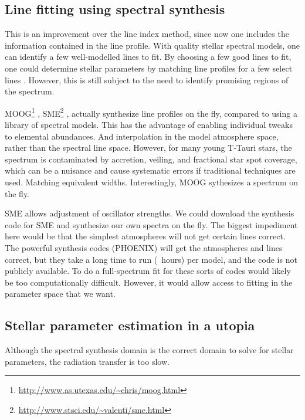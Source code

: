 \documentclass[preprint]{aastex} %
\begin{document}
\subsection{Line fitting using spectral synthesis}
This is an improvement over the line index method, since now one includes the information contained in the line profile. With quality stellar spectral models, one can identify a few well-modelled lines to fit. By choosing a few good lines to fit, one could determine stellar parameters by matching line profiles for a few select lines \citep{dj03}. However, this is still subject to the need to identify promising regions of the spectrum.

MOOG\footnote{\url{http://www.as.utexas.edu/~chris/moog.html}} \citep{sne73}, SME\footnote{\url{http://www.stsci.edu/~valenti/sme.html}} \citep{vp96}, actually synthesize line profiles on the fly, compared to using a library of spectral models. This has the advantage of enabling individual tweaks to elemental abundances. And interpolation in the model atmosphere space, rather than the spectral line space. However, for many young T-Tauri stars, the spectrum is contaminated by accretion, veiling, and fractional star spot coverage, which can be a nuisance and cause systematic errors if traditional techniques are used. Matching equivalent widths. Interestingly, MOOG sythesizes a spectrum on the fly.

SME allows adjustment of oscillator strengths. We could download the synthesis code for SME and synthesize our own spectra on the fly. The biggest impediment here would be that the simplest atmospheres will not get certain lines correct. The powerful synthesis codes (PHOENIX) will get the atmospheres and lines correct, but they take a long time to run (~hours) per model, and the code is not publicly available. To do a full-spectrum fit for these sorts of codes would likely be too computationally difficult. However, it would allow access to fitting in the parameter space that we want.

\subsection{Stellar parameter estimation in a utopia}

Although the spectral synthesis domain is the correct domain to solve for stellar parameters, the radiation transfer is too slow.
\end{document}
